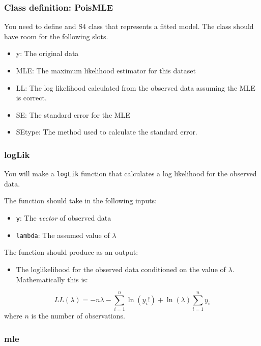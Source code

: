 \documentclass[
]{article}
\providecommand{\tightlist}{%
  \setlength{\itemsep}{0pt}\setlength{\parskip}{0pt}}
\begin{document}
\hypertarget{class-definition-poismle}{%
\subsubsection{Class definition:
PoisMLE}\label{class-definition-poismle}}

You need to define and S4 class that represents a fitted model. The
class should have room for the following slots.

\begin{itemize}
\tightlist
\item
  y: The original data
\item
  MLE: The maximum likelihood estimator for this dataset
\item
  LL: The log likelihood calculated from the observed data assuming the
  MLE is correct.
\item
  SE: The standard error for the MLE
\item
  SEtype: The method used to calculate the standard error.
\end{itemize}

\hypertarget{loglik}{%
\subsubsection{logLik}\label{loglik}}

You will make a \texttt{logLik} function that calculates a log
likelihood for the observed data.

The function should take in the following inputs:

\begin{itemize}
\tightlist
\item
  \texttt{y}: The \emph{vector} of observed data
\item
  \texttt{lambda}: The assumed value of \(\lambda\)
\end{itemize}

The function should produce as an output:

\begin{itemize}
\tightlist
\item
  The loglikelihood for the observed data conditioned on the value of
  \(\lambda\). Mathematically this is:
\end{itemize}

\[LL(\lambda)=-n \lambda-\sum_{i=1}^n\ln(y_i!) + \ln(\lambda)\sum_{i=1}^ny_i\]
where \(n\) is the number of observations.

\hypertarget{mle}{%
\subsubsection{mle}\label{mle}}
\end{document}
